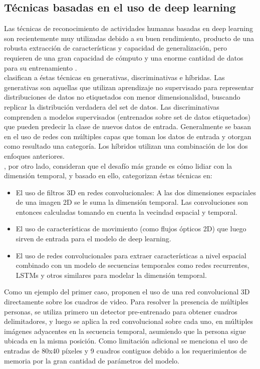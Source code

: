\subsection{Técnicas basadas en el uso de deep learning}

Las técnicas de reconocimiento de actividades humanas basadas en deep learning son recientemente muy utilizadas debido a su buen rendimiento, producto de una robusta extracción de características y capacidad de generalización, pero requieren de una gran capacidad de cómputo y una enorme cantidad de datos para su entrenamiento \citep{Beddiar2020}. \\

\citep{Beddiar2020} clasifican a éstas técnicas en generativas, discriminativas e híbridas. Las generativas son aquellas que utilizan aprendizaje no supervisado para representar distribuciones de datos no etiquetados con menor dimensionalidad, buscando replicar la distribución verdadera del set de datos.
Las discriminativas comprenden a modelos supervisados (entrenados sobre set de datos etiquetados) que pueden predecir la clase de nuevos datos de entrada. Generalmente se basan en el uso de redes con múltiples capas que toman los datos de entrada y otorgan como resultado una categoría.
Los híbridos utilizan una combinación de los dos enfoques anteriores. \\

\citep{Asadi-Aghbolaghi2017}, por otro lado, consideran que el desafío más grande es cómo lidiar con la dimensión temporal, y basado en ello, categorizan éstas técnicas en:

\begin{itemize}
	\item El uso de filtros 3D en redes convolucionales: A las dos dimensiones espaciales de una imagen 2D se le suma la dimensión temporal. Las convoluciones son entonces calculadas tomando en cuenta la vecindad espacial y temporal.
	\item El uso de características de movimiento (como flujos ópticos 2D) que luego sirven de entrada para el modelo de deep learning. 
	\item El uso de redes convolucionales para extraer características a nivel espacial combinado con un modelo de secuencias temporales como redes recurrentes, LSTMs y otros similares para modelar la dimensión temporal.
\end{itemize}

Como un ejemplo del primer caso, \citep{Ji2013} proponen el uso de una red convolucional 3D directamente sobre los cuadros de video. Para resolver la presencia de múltiples personas, se utiliza primero un detector pre-entrenado para obtener cuadros delimitadores, y luego se aplica la red convolucional sobre cada uno, en múltiples imágenes adyacentes en la secuencia temporal, asumiendo que la persona sigue ubicada en la misma posición. Como limitación adicional se menciona el uso de entradas de 80x40 píxeles y 9 cuadros contiguos debido a los requerimientos de memoria por la gran cantidad de parámetros del modelo. \\

